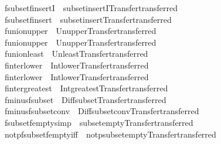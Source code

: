 \begin{isabellebody}
\ fsubset{\isacharunderscore}finsertI{}\ {\isacharequal}\ subset{\isacharunderscore}insertI{}{\isacharbrackleft}Transfer{\isachardot}transferred{\isacharbrackright}\isanewline
{}\isamarkupfalse%
\ fsubset{\isacharunderscore}finsert\ {\isacharequal}\ subset{\isacharunderscore}insert{\isacharbrackleft}Transfer{\isachardot}transferred{\isacharbrackright}\isanewline
{}\isamarkupfalse%
\ funion{\isacharunderscore}upper{}\ {\isacharequal}\ Un{\isacharunderscore}upper{}{\isacharbrackleft}Transfer{\isachardot}transferred{\isacharbrackright}\isanewline
{}\isamarkupfalse%
\ funion{\isacharunderscore}upper{}\ {\isacharequal}\ Un{\isacharunderscore}upper{}{\isacharbrackleft}Transfer{\isachardot}transferred{\isacharbrackright}\isanewline
{}\isamarkupfalse%
\ funion{\isacharunderscore}least\ {\isacharequal}\ Un{\isacharunderscore}least{\isacharbrackleft}Transfer{\isachardot}transferred{\isacharbrackright}\isanewline
{}\isamarkupfalse%
\ finter{\isacharunderscore}lower{}\ {\isacharequal}\ Int{\isacharunderscore}lower{}{\isacharbrackleft}Transfer{\isachardot}transferred{\isacharbrackright}\isanewline
{}\isamarkupfalse%
\ finter{\isacharunderscore}lower{}\ {\isacharequal}\ Int{\isacharunderscore}lower{}{\isacharbrackleft}Transfer{\isachardot}transferred{\isacharbrackright}\isanewline
{}\isamarkupfalse%
\ finter{\isacharunderscore}greatest\ {\isacharequal}\ Int{\isacharunderscore}greatest{\isacharbrackleft}Transfer{\isachardot}transferred{\isacharbrackright}\isanewline
{}\isamarkupfalse%
\ fminus{\isacharunderscore}fsubset\ {\isacharequal}\ Diff{\isacharunderscore}subset{\isacharbrackleft}Transfer{\isachardot}transferred{\isacharbrackright}\isanewline
{}\isamarkupfalse%
\ fminus{\isacharunderscore}fsubset{\isacharunderscore}conv\ {\isacharequal}\ Diff{\isacharunderscore}subset{\isacharunderscore}conv{\isacharbrackleft}Transfer{\isachardot}transferred{\isacharbrackright}\isanewline
{}\isamarkupfalse%
\ fsubset{\isacharunderscore}fempty{\isacharbrackleft}simp{\isacharbrackright}\ {\isacharequal}\ subset{\isacharunderscore}empty{\isacharbrackleft}Transfer{\isachardot}transferred{\isacharbrackright}\isanewline
{}\isamarkupfalse%
\ not{\isacharunderscore}pfsubset{\isacharunderscore}fempty{\isacharbrackleft}iff{\isacharbrackright}\ {\isacharequal}\ not{\isacharunderscore}psubset{\isacharunderscore}empty{\isacharbrackleft}Transfer{\isachardot}transferred{\isacharbrackright}\isanewline

\end{isabellebody}
